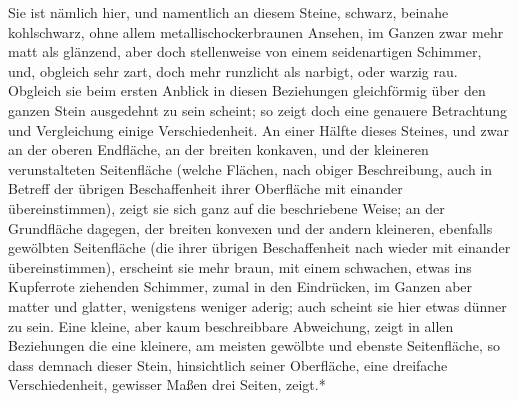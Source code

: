 \documentclass[a4paper, 11pt, oneside, german]{article}
\begin{document}
Sie ist nämlich hier, und namentlich an diesem Steine, schwarz, beinahe kohlschwarz, ohne allem metallischockerbraunen Ansehen, im Ganzen zwar mehr matt als glänzend, aber doch stellenweise von einem seidenartigen Schimmer, und, obgleich sehr zart, doch mehr runzlicht als narbigt, oder warzig rau. Obgleich sie beim ersten Anblick in diesen Beziehungen gleichförmig über den ganzen Stein ausgedehnt zu sein scheint; so zeigt doch eine genauere Betrachtung und Vergleichung einige Verschiedenheit. An einer Hälfte dieses Steines, und zwar an der oberen Endfläche, an der breiten konkaven, und der kleineren verunstalteten Seitenfläche (welche Flächen, nach obiger Beschreibung, auch in Betreff der übrigen Beschaffenheit ihrer Oberfläche mit einander übereinstimmen), zeigt sie sich ganz auf die beschriebene Weise; an der Grundfläche dagegen, der breiten konvexen und der andern kleineren, ebenfalls gewölbten Seitenfläche (die ihrer übrigen Beschaffenheit nach wieder mit einander übereinstimmen), erscheint sie mehr braun, mit einem schwachen, etwas ins Kupferrote ziehenden Schimmer, zumal in den Eindrücken, im Ganzen aber matter und glatter, wenigstens weniger aderig; auch scheint sie hier etwas dünner zu sein. Eine kleine, aber kaum beschreibbare Abweichung, zeigt in allen Beziehungen die eine kleinere, am meisten gewölbte und ebenste Seitenfläche, so dass demnach dieser Stein, hinsichtlich seiner Oberfläche, eine dreifache Verschiedenheit, gewisser Maßen drei Seiten, zeigt.*
\end{document}
